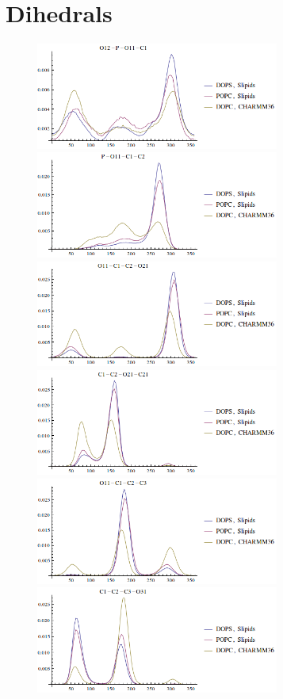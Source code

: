 \documentclass[aps,prl,superscriptaddress,twocolumn]{revtex4}
\begin{document}
\section{Dihedrals}
\begin{figure}[]
  \centering
  \includegraphics[width=8.0cm]{../Figs/dihed1.png}
  \includegraphics[width=8.0cm]{../Figs/dihed2.png}
  \includegraphics[width=8.0cm]{../Figs/dihed3.png}
  \includegraphics[width=8.0cm]{../Figs/dihed4.png}
  \includegraphics[width=8.0cm]{../Figs/dihed5.png}
  \includegraphics[width=8.0cm]{../Figs/dihed6.png}

\end{figure}
\end{document}
